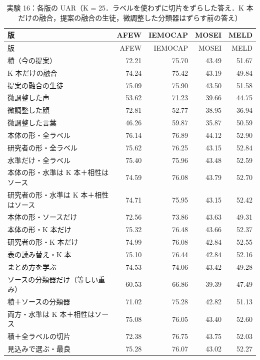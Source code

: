 \begin{longtable}{>{\raggedright}p{8.2cm}rrrr}
\caption{実験 16：各版の UAR（K = 25．ラベルを使わずに切片をずらした答え．K 本だけの融合，提案の融合の生徒，微調整した分類器はずらす前の答え）}\\
\toprule
版 & AFEW & IEMOCAP & MOSEI & MELD \\
\midrule
\endfirsthead
\toprule
版 & AFEW & IEMOCAP & MOSEI & MELD \\
\midrule
\endhead
\bottomrule
\endfoot

積（今の提案） & 72.21 & 75.70 & 43.49 & 51.67 \\
K 本だけの融合 & 74.24 & 75.42 & 43.19 & 49.84 \\
提案の融合の生徒 & 75.09 & 75.90 & 43.50 & 51.58 \\
微調整した声 & 53.62 & 71.23 & 39.66 & 44.75 \\
微調整した顔 & 72.81 & 52.77 & 38.95 & 36.94 \\
微調整した言葉 & 46.26 & 59.87 & 35.87 & 50.59 \\
本体の形・全ラベル & 76.14 & 76.89 & 44.12 & 52.90 \\
研究者の形・全ラベル & 75.62 & 76.25 & 43.15 & 52.84 \\
水準だけ・全ラベル & 75.40 & 75.96 & 43.48 & 52.59 \\
本体の形・水準は K 本＋相性はソース & 74.59 & 76.08 & 43.79 & 52.70 \\
研究者の形・水準は K 本＋相性はソース & 74.71 & 75.95 & 43.15 & 52.42 \\
本体の形・ソースだけ & 72.56 & 73.86 & 43.63 & 49.31 \\
本体の形・K 本だけ & 75.32 & 76.48 & 43.66 & 52.37 \\
研究者の形・K 本だけ & 74.99 & 76.08 & 42.84 & 52.55 \\
表の読み替え・K 本 & 75.10 & 76.44 & 42.84 & 52.16 \\
まとめ方を学ぶ & 74.53 & 74.06 & 43.42 & 49.28 \\
ソースの分類器だけ（等しい重み） & 60.53 & 66.86 & 39.39 & 47.49 \\
積＋ソースの分類器 & 71.02 & 75.28 & 42.82 & 51.13 \\
両方・水準は K 本＋相性はソース & 75.08 & 76.05 & 43.40 & 52.60 \\
積＋全ラベルの切片 & 72.38 & 76.75 & 43.75 & 52.03 \\
見込みで選ぶ・最良 & 75.28 & 76.07 & 43.02 & 52.27 \\
\end{longtable}
